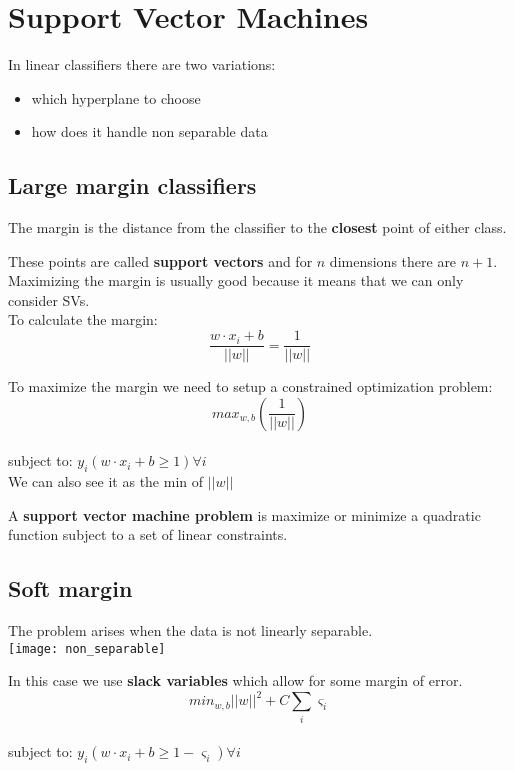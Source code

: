 \chapter{Support Vector Machines}

In linear classifiers there are two variations: 
\begin{itemize}
	\item which hyperplane to choose
	\item how does it handle non separable data
\end{itemize}

\section{Large margin classifiers}
\begin{definition}[Margin]
	The margin is the distance from the classifier to the \textbf{closest} point of either class.
\end{definition}

These points are called \textbf{support vectors} and for $n$ dimensions there are $n+1$.\\
Maximizing the margin is usually good because it means that we can only consider SVs. \\
To calculate the margin: \\
\[
\frac{w\cdot x_i + b}{||w||} = \frac{1}{||w||}
\]

To maximize the margin we need to setup a constrained optimization problem: \\
\[
max_{w,b} (\frac{1}{||w||})
\]
\\
subject to: $y_i (w\cdot x_i + b \geq 1) \forall i$\\

We can also see it as the min of $||w||$

A \textbf{support vector machine problem} is maximize or minimize a quadratic function subject to a set of linear constraints. 

\section{Soft margin}

The problem arises when the data is not linearly separable. \\
\texttt{[image: non\_separable]}

In this case we use \textbf{slack variables} which allow for some margin of error. 
\[
min_{w,b} ||w||^2 + C \sum_{i} {\varsigma}_i
\]\\
subject to: $y_i (w\cdot x_i + b \geq 1- {\varsigma}_i) \forall i$\\

